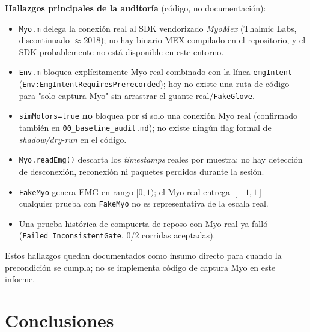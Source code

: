 \documentclass[11pt,a4paper]{article}
\begin{document}
\textbf{Hallazgos principales de la auditoría} (código, no documentación):
\begin{itemize}
  \item \texttt{Myo.m} delega la conexión real al SDK vendorizado \emph{MyoMex}
    (Thalmic Labs, discontinuado $\approx$2018); no hay binario MEX compilado en el
    repositorio, y el SDK probablemente no está disponible en este entorno.
  \item \texttt{Env.m} bloquea explícitamente Myo real combinado con la línea
    \texttt{emgIntent} (\texttt{Env:EmgIntentRequiresPrerecorded}); hoy no existe una
    ruta de código para "solo captura Myo" sin arrastrar el guante real/\texttt{FakeGlove}.
  \item \texttt{simMotors=true} \textbf{no} bloquea por sí solo una conexión Myo real
    (confirmado también en \texttt{00\_baseline\_audit.md}); no existe ningún flag
    formal de \emph{shadow/dry-run} en el código.
  \item \texttt{Myo.readEmg()} descarta los \emph{timestamps} reales por muestra; no
    hay detección de desconexión, reconexión ni paquetes perdidos durante la sesión.
  \item \texttt{FakeMyo} genera EMG en rango $[0,1)$; el Myo real entrega $[-1,1]$ ---
    cualquier prueba con \texttt{FakeMyo} no es representativa de la escala real.
  \item Una prueba histórica de compuerta de reposo con Myo real ya falló
    (\texttt{Failed\_InconsistentGate}, 0/2 corridas aceptadas).
\end{itemize}

Estos hallazgos quedan documentados como insumo directo para cuando la precondición se
cumpla; no se implementa código de captura Myo en este informe.

\section{Conclusiones}
\end{document}
